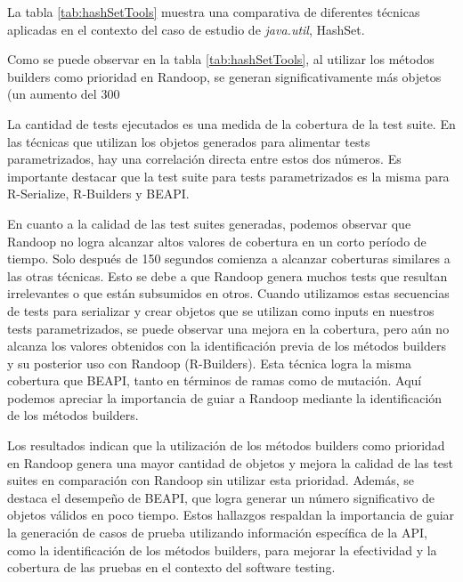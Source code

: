  
La tabla \ref{tab:hashSetTools} muestra una comparativa de diferentes técnicas aplicadas en el contexto del caso de estudio de \emph{java.util}, HashSet.


Como se puede observar en la tabla \ref{tab:hashSetTools}, al utilizar los métodos builders como prioridad en Randoop, se generan significativamente más objetos (un aumento del 300%

La cantidad de tests ejecutados es una medida de la cobertura de la test suite. En las técnicas que utilizan los objetos generados para alimentar tests parametrizados, hay una correlación directa entre estos dos números. Es importante destacar que la test suite para tests parametrizados es la misma para R-Serialize, R-Builders y BEAPI.

En cuanto a la calidad de las test suites generadas, podemos observar que Randoop no logra alcanzar altos valores de cobertura en un corto período de tiempo. Solo después de 150 segundos comienza a alcanzar coberturas similares a las otras técnicas. Esto se debe a que Randoop genera muchos tests que resultan irrelevantes o que están subsumidos en otros. Cuando utilizamos estas secuencias de tests para serializar y crear objetos que se utilizan como inputs en nuestros tests parametrizados, se puede observar una mejora en la cobertura, pero aún no alcanza los valores obtenidos con la identificación previa de los métodos builders y su posterior uso con Randoop (R-Builders). Esta técnica logra la misma cobertura que BEAPI, tanto en términos de ramas como de mutación. Aquí podemos apreciar la importancia de guiar a Randoop mediante la identificación de los métodos builders.



Los resultados indican que la utilización de los métodos builders como prioridad en Randoop genera una mayor cantidad de objetos y mejora la calidad de las test suites en comparación con Randoop sin utilizar esta prioridad. Además, se destaca el desempeño de BEAPI, que logra generar un número significativo de objetos válidos en poco tiempo. Estos hallazgos respaldan la importancia de guiar la generación de casos de prueba utilizando información específica de la API, como la identificación de los métodos builders, para mejorar la efectividad y la cobertura de las pruebas en el contexto del software testing.





